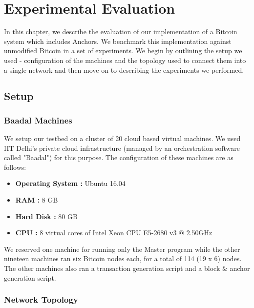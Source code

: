 \chapter{Experimental Evaluation} \label{ch-exp}

In this chapter, we describe the evaluation of our implementation of a Bitcoin system which includes Anchors. We benchmark this implementation against unmodified Bitcoin in a set of experiments. We begin by outlining the setup we used - configuration of the machines and the topology used to connect them into a single network and then move on to describing the experiments we performed.


\section{Setup} \label{exp-setup}

\subsection{Baadal Machines} \label{exp-setup-baadal}

We setup our testbed on a cluster of 20 cloud based virtual machines. We used IIT Delhi's private cloud infrastructure (managed by an orchestration software called "Baadal") for this purpose. The configuration of these machines are as follows:

\begin{itemize}
    \item \textbf{Operating System :} Ubuntu 16.04
    \item \textbf{RAM :} 8 GB
    \item \textbf{Hard Disk :} 80 GB
    \item \textbf{CPU :} 8 virtual cores of Intel Xeon CPU E5-2680 v3 @ 2.50GHz
\end{itemize}

We reserved one machine for running only the Master program while the other nineteen machines ran six Bitcoin nodes each, for a total of 114 (19 x 6) nodes. The other machines also ran a transaction generation script and a block \& anchor generation script.


\newpage

\subsection{Network Topology} \label{exp-setup-topology}

